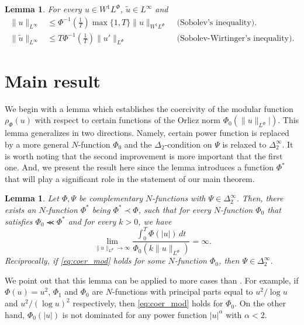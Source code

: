 \documentclass[twoside]{elsarticle}
\newtheorem{lem}[thm]{Lemma}
\theoremstyle{remark}
\newcommand{\orlnor}{\|_{L^{\Phi}}}
\newcommand{\lphi}{L^{\Phi}}
\newcommand{\wphi}{W^{1}\lphi}
\newcommand{\sobnor}{\|_{W^{1}\lphi}}
\renewcommand{\leq}{\leqslant}
\newcounter{example}
\begin{document}
\begin{lem}\label{inclusion orlicz} For every $u\in\wphi$, $\widetilde{u}\in L^{\infty}$ and
\begin{align}
 \|u\|_{L^{\infty}} &\leq\Phi^{-1}\left(\frac{1}{T}\right)\max\{1,T\}\|u\sobnor&\text{  (Sobolev's inequality).}\label{sobolev}\\
 \|\widetilde{u}\|_{L^{\infty}} &\leq T\Phi^{-1}\left(\frac{1}{T}\right)\|u'\orlnor&
\text{  (Sobolev-Wirtinger's inequality).}\label{wirtinger}
\end{align}

\end{lem}


\section{Main result}

We begin with a lemma which establishes the coercivity of the modular function $\rho_{\Phi}(u)$ with respect to certain functions of the Orlicz norm $\Phi_0(\|u\orlnor|)$. This lemma generalizes \cite[Lemma 5.2]{ABGMS2015} in two directions. 
Namely, certain power function is replaced by a more general $N$-function $\Phi_0$ and 
the $\Delta_2$-condition  on $\Psi$ is relaxed to $\Delta_2^{\infty}$. 
It is worth noting that the second improvement is more important that the first one.
And, we present the result here since the lemma introduces a function $\Phi^*$ that will play a significant role in the statement of our main theorem.

\begin{lem}\label{lem_coer}
Let $\Phi,\Psi$ be complementary $N$-functions with $\Psi \in \Delta_2^{\infty}$. Then, 
there exists an $N$-function $\Phi^*$ being $\Phi^*\prec\Phi$, 
such that  for every $N$-function $\Phi_0$ that satisfies $\Phi_0\llcurly\Phi^*$ and for every $k>0$, we have
\begin{equation}\label{eq:coer_mod}
\lim\limits_{\|u\orlnor\to \infty}
\frac{\int_0^T \Phi(|u|)\,dt}{\Phi_0(k\|u\orlnor)}=\infty.
\end{equation}
Reciprocally, if  \eqref{eq:coer_mod} holds for some $N$-function $\Phi_0$,  then $\Psi\in\Delta_2^{\infty}$.
\end{lem}



 We point out that this lemma can be applied to more cases than \cite[Lemma 5.2]{ABGMS2015}. For example, if $\Phi(u)=u^2$, $\Phi_1$ and $\Phi_0$ are  $N$-functions with principal parts equal to $u^2/\log u$ and $u^2/(\log u)^2$ respectively, then  \eqref{eq:coer_mod} holds for $\Phi_0$. On the other hand, $\Phi_0(|u|)$ is not dominated for any  power function $|u|^{\alpha}$ with $\alpha<2$.
\end{document}
